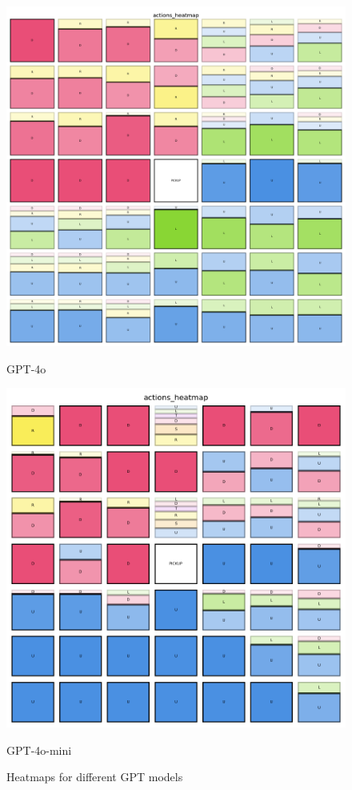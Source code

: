 \begin{figure}[h]
\begin{minipage}[b]{0.32\textwidth}
    \includegraphics[width=\textwidth]{
      images/results_discussion/models/GPT4o/actions_heatmap.png
    }
    \caption{GPT-4o}
    \label{fig:models_gpt4o}
  \end{minipage}
  \hfill
  \begin{minipage}[b]{0.32\textwidth}
    \centering
    \includegraphics[width=\textwidth]{
      images/results_discussion/models/GPT4o-mini/actions_heatmap.png
    }
    \caption{GPT-4o-mini}
    \label{fig:models_gpt4o_mini}
  \end{minipage}
  \caption{Heatmaps for different GPT models}
  \label{fig:models_hm}
\end{figure}

